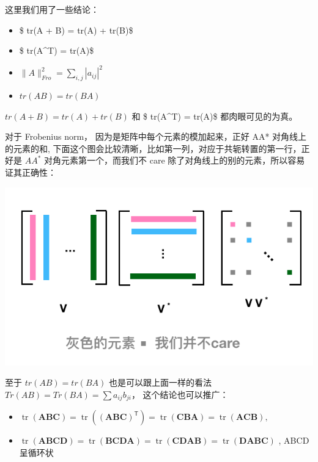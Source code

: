 \documentclass[
]{book}
\providecommand{\tightlist}{%
  \setlength{\itemsep}{0pt}\setlength{\parskip}{0pt}}
\begin{document}
这里我们用了一些结论：

\begin{itemize}
\tightlist
\item
  \$ tr(A + B) = tr(A) + tr(B)\$
\item
  \$ tr(A\^{}T) = tr(A)\$
\item
  \(\parallel A \parallel_{Fro}^2 = \sum_{i,j} | a_{ij}|^2\)
\item
  \(tr(AB) = tr(BA)\)
\end{itemize}

\(tr(A + B) = tr(A) + tr(B)\) 和 \$ tr(A\^{}T) = tr(A)\$ 都肉眼可见的为真。

对于 Frobenius norm， 因为是矩阵中每个元素的模加起来，正好 AA* 对角线上的元素的和, 下面这个图会比较清晰，比如第一列，对应于共轭转置的第一行，正好是 \(AA^*\) 对角元素第一个，而我们不 care 除了对角线上的别的元素，所以容易证其正确性：

\includegraphics{images/Frobenius.png}

至于 \(tr(AB) = tr(BA)\) 也是可以跟上面一样的看法 \(Tr(AB) = Tr (BA) = \sum a_{ij} b_{ji}\)， 这个结论也可以推广：

\begin{itemize}
\tightlist
\item
  \({\displaystyle \operatorname {tr} (\mathbf {A} \mathbf {B} \mathbf {C} )=\operatorname {tr} \left(\left(\mathbf {A} \mathbf {B} \mathbf {C} \right)^{\mathsf {T}}\right)=\operatorname {tr} (\mathbf {C} \mathbf {B} \mathbf {A} )=\operatorname {tr} (\mathbf {A} \mathbf {C} \mathbf {B} ),}\)
\item
  \({\displaystyle \operatorname {tr} (\mathbf {A} \mathbf {B} \mathbf {C} \mathbf {D} )=\operatorname {tr} (\mathbf {B} \mathbf {C} \mathbf {D} \mathbf {A} )=\operatorname {tr} (\mathbf {C} \mathbf {D} \mathbf {A} \mathbf {B} )=\operatorname {tr} (\mathbf {D} \mathbf {A} \mathbf {B} \mathbf {C} )}\) , ABCD 呈循环状
\end{itemize}
\end{document}
